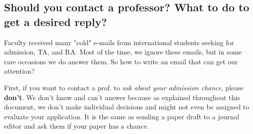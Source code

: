 \documentclass[11pt]{article}
\newenvironment{commentbox}[1][]{
\small
    \begin{cbox}
    \textbf{#1} 
 }{
   \end{cbox}
}
\begin{document}



\subsection{Should you contact a professor? What to do to get a desired reply?}

Faculty received many "cold" e-mails from international students seeking for admission, TA, and RA. Most of the time, we ignore these emails, but in some rare occasions we do answer them. So how to write an email that can get our attention?

First, if you want to contact a prof. to \emph{ask about your admission chance}, please \textbf{don't}. We don't know and can't answer because as explained throughout this document, we don't make individual decisions and might not even be assigned to evaluate your application.  It is the same as sending a paper draft to a journal editor and ask them if your paper has a chance.  
\end{document}
